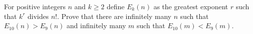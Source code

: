 For positive integers $n$ and $k \geq 2$ define $E_k(n)$ as the greatest exponent $r$ such that $k^r$ divides $n!$. Prove that there are infinitely many $n$ such that $E_{10}(n) > E_9(n)$ and infinitely many $m$ such that $E_{10}(m) < E_9(m)$.
